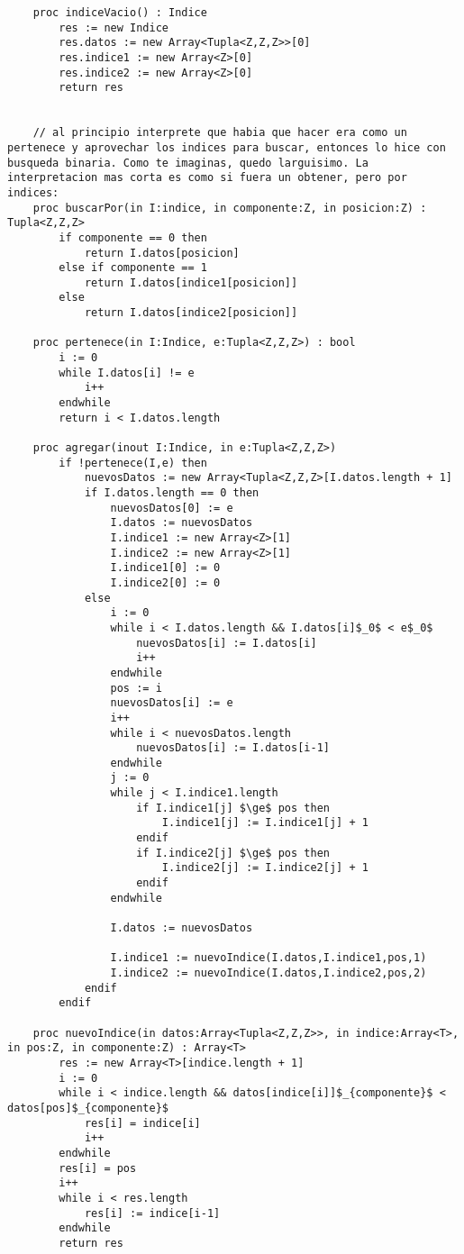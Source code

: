 \documentclass[10pt,a4paper]{article}
\begin{document}
\begin{lstlisting}
	proc indiceVacio() : Indice
		res := new Indice
		res.datos := new Array<Tupla<Z,Z,Z>>[0]
		res.indice1 := new Array<Z>[0]
		res.indice2 := new Array<Z>[0]
		return res


	// al principio interprete que habia que hacer era como un pertenece y aprovechar los indices para buscar, entonces lo hice con busqueda binaria. Como te imaginas, quedo larguisimo. La interpretacion mas corta es como si fuera un obtener, pero por indices: 
	proc buscarPor(in I:indice, in componente:Z, in posicion:Z) : Tupla<Z,Z,Z>
		if componente == 0 then
			return I.datos[posicion]
		else if componente == 1
			return I.datos[indice1[posicion]]
		else 
			return I.datos[indice2[posicion]]

	proc pertenece(in I:Indice, e:Tupla<Z,Z,Z>) : bool
		i := 0 
		while I.datos[i] != e 
			i++
		endwhile
		return i < I.datos.length

	proc agregar(inout I:Indice, in e:Tupla<Z,Z,Z>)
		if !pertenece(I,e) then
			nuevosDatos := new Array<Tupla<Z,Z,Z>[I.datos.length + 1]
			if I.datos.length == 0 then
				nuevosDatos[0] := e
				I.datos := nuevosDatos
				I.indice1 := new Array<Z>[1]
				I.indice2 := new Array<Z>[1]
				I.indice1[0] := 0
				I.indice2[0] := 0
			else 
				i := 0 
				while i < I.datos.length && I.datos[i]$_0$ < e$_0$
					nuevosDatos[i] := I.datos[i]
					i++
				endwhile
				pos := i 
				nuevosDatos[i] := e 
				i++
				while i < nuevosDatos.length
					nuevosDatos[i] := I.datos[i-1]
				endwhile
				j := 0
				while j < I.indice1.length
					if I.indice1[j] $\ge$ pos then
						I.indice1[j] := I.indice1[j] + 1
					endif
					if I.indice2[j] $\ge$ pos then
						I.indice2[j] := I.indice2[j] + 1
					endif
				endwhile

				I.datos := nuevosDatos

				I.indice1 := nuevoIndice(I.datos,I.indice1,pos,1)
				I.indice2 := nuevoIndice(I.datos,I.indice2,pos,2)
			endif
		endif
	
	proc nuevoIndice(in datos:Array<Tupla<Z,Z,Z>>, in indice:Array<T>, in pos:Z, in componente:Z) : Array<T>
		res := new Array<T>[indice.length + 1]
		i := 0
		while i < indice.length && datos[indice[i]]$_{componente}$ < datos[pos]$_{componente}$
			res[i] = indice[i]
			i++
		endwhile
		res[i] = pos
		i++
		while i < res.length
			res[i] := indice[i-1]
		endwhile
		return res


\end{lstlisting}
\end{document}
